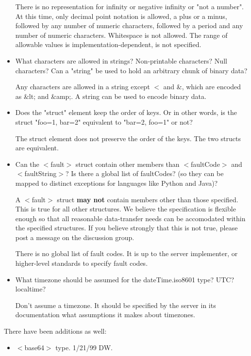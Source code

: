 \documentclass[10pt]{article}
\begin{document}
\begin{itemize}
There is no representation for infinity or negative infinity or "not a number". At this time, only decimal point notation is allowed, a plus or a minus, followed by any number of numeric characters, followed by a period and any number of numeric characters. Whitespace is not allowed. The range of allowable values is implementation-dependent, is not specified.

\item What characters are allowed in strings? Non-printable characters? Null characters? Can a "string" be used to hold an arbitrary chunk of binary data? 

Any characters are allowed in a string except $<$ and \&, which are encoded as \&lt; and \&amp;. A string can be used to encode binary data.

\item Does the "struct" element keep the order of keys. Or in other words, is the struct "foo=1, bar=2" equivalent to "bar=2, foo=1" or not? 

The struct element does not preserve the order of the keys. The two structs are equivalent.

\item Can the $<$fault$>$ struct contain other members than $<$faultCode$>$ and $<$faultString$>$? Is there a global list of faultCodes? (so they can be mapped to distinct exceptions for languages like Python and Java)? 

A $<$fault$>$ struct \textbf{may not}
contain members other than those specified. This is true for all other structures. We believe the specification is flexible enough so that all reasonable data-transfer needs can be accomodated within the specified structures. If you believe strongly that this is not true, please post a message on the discussion group.

There is no global list of fault codes. It is up to the server implementer, or higher-level standards to specify fault codes.

\item What timezone should be assumed for the dateTime.iso8601 type? UTC? localtime? 

Don't assume a timezone. It should be specified by the server in its documentation what assumptions it makes about timezones.
\end{itemize}

There have been additions as well:
\begin{itemize}
\item $<$base64$>$ type. 1/21/99 DW.
\end{itemize}
\end{document}
